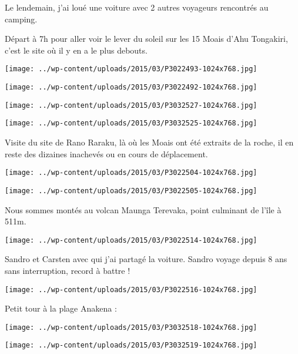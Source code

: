  Le lendemain, j'ai loué une voiture avec 2 autres voyageurs rencontrés au camping.

 Départ à 7h pour aller voir le lever du soleil sur les 15 Moais d'Ahu Tongakiri, c'est le site où il y en a le plus debouts.
\begin{center} \texttt{[image: ../wp-content/uploads/2015/03/P3022493-1024x768.jpg]} \end{center}
\begin{center} \texttt{[image: ../wp-content/uploads/2015/03/P3022492-1024x768.jpg]} \end{center}
\begin{center} \texttt{[image: ../wp-content/uploads/2015/03/P3032527-1024x768.jpg]} \end{center}
\begin{center} \texttt{[image: ../wp-content/uploads/2015/03/P3032525-1024x768.jpg]} \end{center}

Visite du site de Rano Raraku, là où les Moais ont été extraits de la roche, il en reste des dizaines inachevés ou en cours de déplacement.
\begin{center} \texttt{[image: ../wp-content/uploads/2015/03/P3022504-1024x768.jpg]} \end{center}
\begin{center} \texttt{[image: ../wp-content/uploads/2015/03/P3022505-1024x768.jpg]} \end{center}

 Nous sommes montés au volcan Maunga Terevaka, point culminant de l'île à 511m.
\begin{center} \texttt{[image: ../wp-content/uploads/2015/03/P3022514-1024x768.jpg]} \end{center}
\vspace{-\topsep}

\pagebreak
 Sandro et Carsten avec qui j'ai partagé la voiture. Sandro voyage depuis 8 ans sans interruption, record à battre !
\begin{center} \texttt{[image: ../wp-content/uploads/2015/03/P3022516-1024x768.jpg]} \end{center}

Petit tour à la plage Anakena :
\begin{center} \texttt{[image: ../wp-content/uploads/2015/03/P3032518-1024x768.jpg]} \end{center}
\begin{center} \texttt{[image: ../wp-content/uploads/2015/03/P3032519-1024x768.jpg]} \end{center}

